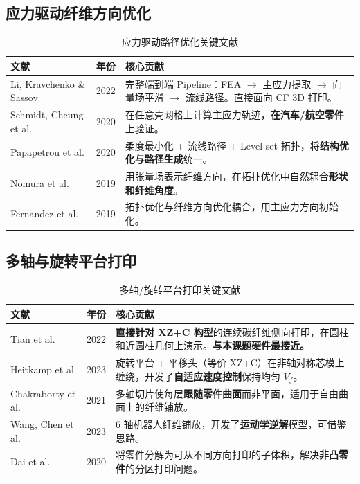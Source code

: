 \documentclass[11pt,a4paper]{article}
\begin{document}
\subsection{应力驱动纤维方向优化}

\begin{table}[H]
\centering
\small
\begin{tabularx}{\textwidth}{l l X}
\toprule
\textbf{文献} & \textbf{年份} & \textbf{核心贡献} \\
\midrule
Li, Kravchenko \& Sassov & 2022 & 完整端到端 Pipeline：FEA $\to$ 主应力提取 $\to$ 向量场平滑 $\to$ 流线路径。直接面向 CF 3D 打印。 \\
Schmidt, Cheung et al. & 2020 & 在任意壳网格上计算主应力轨迹，\textbf{在汽车/航空零件}上验证。 \\
Papapetrou et al. & 2020 & 柔度最小化 + 流线路径 + Level-set 拓扑，将\textbf{结构优化与路径生成}统一。 \\
Nomura et al. & 2019 & 用张量场表示纤维方向，在拓扑优化中自然耦合\textbf{形状和纤维角度}。 \\
Fernandez et al. & 2019 & 拓扑优化与纤维方向优化耦合，用主应力方向初始化。 \\
\bottomrule
\end{tabularx}
\caption{应力驱动路径优化关键文献}
\end{table}

\subsection{多轴与旋转平台打印}

\begin{table}[H]
\centering
\small
\begin{tabularx}{\textwidth}{l l X}
\toprule
\textbf{文献} & \textbf{年份} & \textbf{核心贡献} \\
\midrule
Tian et al. & 2022 & \textbf{直接针对 XZ+C 构型}的连续碳纤维侧向打印，在圆柱和近圆柱几何上演示。\textbf{与本课题硬件最接近。} \\
Heitkamp et al. & 2023 & 旋转平台 + 平移头（等价 XZ+C）在非轴对称芯模上缠绕，开发了\textbf{自适应速度控制}保持均匀 $V_f$。 \\
Chakraborty et al. & 2021 & 多轴切片使每层\textbf{跟随零件曲面}而非平面，适用于自由曲面上的纤维铺放。 \\
Wang, Chen et al. & 2023 & 6 轴机器人纤维铺放，开发了\textbf{运动学逆解}模型，可借鉴思路。 \\
Dai et al. & 2020 & 将零件分解为可从不同方向打印的子体积，解决\textbf{非凸零件}的分区打印问题。 \\
\bottomrule
\end{tabularx}
\caption{多轴/旋转平台打印关键文献}
\end{table}
\end{document}
